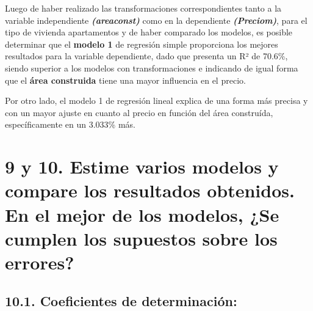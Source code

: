 \documentclass[
]{article}
\newenvironment{Shaded}{\begin{snugshade}}{\end{snugshade}}
\newcommand{\FunctionTok}[1]{\textcolor[rgb]{0.13,0.29,0.53}{\textbf{#1}}}
\newcommand{\NormalTok}[1]{#1}
\newcommand{\OtherTok}[1]{\textcolor[rgb]{0.56,0.35,0.01}{#1}}
\newcommand{\SpecialCharTok}[1]{\textcolor[rgb]{0.81,0.36,0.00}{\textbf{#1}}}
\newcommand{\StringTok}[1]{\textcolor[rgb]{0.31,0.60,0.02}{#1}}
\begin{document}
Luego de haber realizado las transformaciones correspondientes tanto a
la variable independiente \textbf{\emph{(areaconst)}} como en la
dependiente \textbf{\emph{(Preciom)}}, para el tipo de vivienda
apartamentos y de haber comparado los modelos, es posible determinar que
el \textbf{modelo 1} de regresión simple proporciona los mejores
resultados para la variable dependiente, dado que presenta un R² de
70.6\%, siendo superior a los modelos con transformaciones e indicando
de igual forma que el \textbf{área construida} tiene una mayor
influencia en el precio.

Por otro lado, el modelo 1 de regresión lineal explica de una forma más
precisa y con un mayor ajuste en cuanto al precio en función del área
construída, específicamente en un 3.033\% más.

\section{\texorpdfstring{\textbf{9 y 10. Estime varios modelos y compare
los resultados obtenidos. En el mejor de los modelos, ¿Se cumplen los
supuestos sobre los
errores?}}{9 y 10. Estime varios modelos y compare los resultados obtenidos. En el mejor de los modelos, ¿Se cumplen los supuestos sobre los errores?}}\label{y-10.-estime-varios-modelos-y-compare-los-resultados-obtenidos.-en-el-mejor-de-los-modelos-se-cumplen-los-supuestos-sobre-los-errores}

\subsection{\texorpdfstring{\textbf{10.1. Coeficientes de
determinación:}}{10.1. Coeficientes de determinación:}}\label{coeficientes-de-determinaciuxf3n}

\begin{Shaded}
\end{Shaded}
\end{document}
